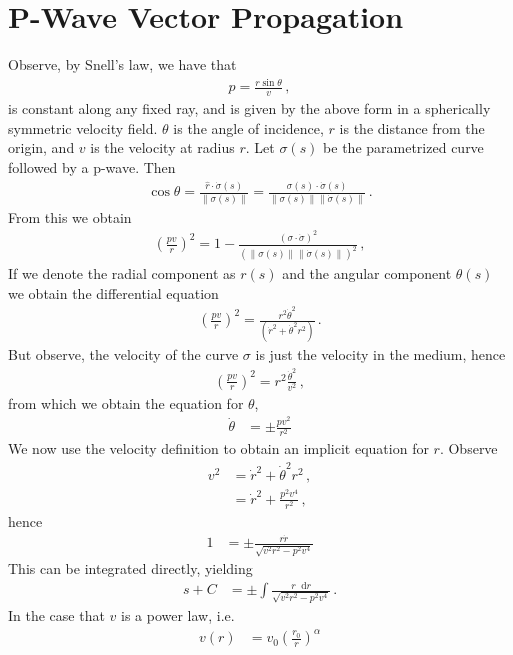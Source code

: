 \documentclass{article}
\newcommand*\diff{\mathop{}\!\mathrm{d}}
\newcommand*\p[1]{\left(#1\right)}
\newcommand*\f[2]{\frac{#1}{#2}}
\begin{document}
\section{P-Wave Vector Propagation}
Observe, by Snell's law, we have that
\begin{align}
p=\f{r\sin\theta}{v}\,,
\end{align}
is constant along any fixed ray, and is given by the above form in a spherically symmetric velocity field. $\theta$ is the angle of incidence, $r$ is the distance from the origin, and $v$ is the velocity at radius $r$. Let $\sigma(s)$ be the parametrized curve followed by a p-wave. Then
\begin{align}
\cos\theta=\f{\hat r\cdot\dot\sigma(s)}{\|\sigma(s)\|}=\f{\sigma(s)\cdot\dot\sigma(s)}{\|\sigma(s)\|\|\dot\sigma(s)\|}\,.
\end{align}
From this we obtain
\begin{align}
\p{\f{pv}{r}}^2=1-\f{(\sigma\cdot\dot\sigma)^2}{(\|\sigma(s)\|\|\dot\sigma(s)\|)^2}\,,
\end{align}
If we denote the radial component as $r(s)$ and the angular component $\theta(s)$ we obtain the differential equation
\begin{align}
\p{\f{pv}{r}}^2=\f{r^2\dot \theta^2}{(\dot r^2+\dot\theta^2 r^2)}\,.
\end{align}
But observe, the velocity of the curve $\sigma$ is just the velocity in the medium, hence
\begin{align}
\p{\f{pv}{r}}^2=r^2\f{\dot \theta^2}{v^2}\,,
\end{align}
from which we obtain the equation for $\theta$,
\begin{align}
\dot \theta&=\pm\f{p v^2}{r^2}
\end{align}
We now use the velocity definition to obtain an implicit equation for $r$. Observe
\begin{align}
v^2&=\dot r^2+\dot\theta^2r^2\,,\\
&=\dot r^2+\f{p^2 v^4}{r^2}\,,
\end{align}
hence
\begin{align}
1&=\pm\f{r\dot r}{\sqrt{v^2r^2-p^2v^4}}
\end{align}
This can be integrated directly, yielding
\begin{align}
s+C&=\pm\int\f{r\diff r}{\sqrt{v^2r^2-p^2v^4}}\,.
\end{align}
In the case that $v$ is a power law, i.e.
\begin{align}
v(r)&=v_0\p{\f{r_0}{r}}^\alpha
\end{align}
\end{document}
